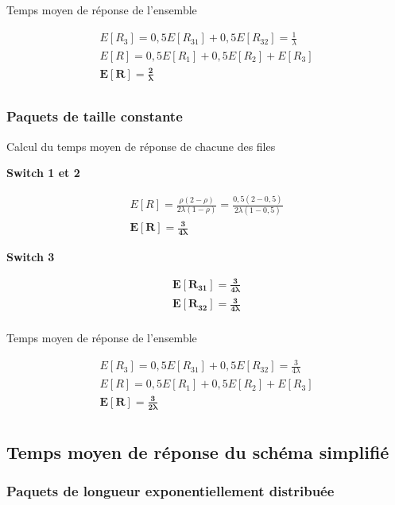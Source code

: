 \documentclass[12pt, a4paper]{article}
\begin{document}
\quad Temps moyen de r\'eponse de l'ensemble

\medskip

\begin{gather*}
E[R_{3}]=0,5E[R_{31}]+0,5E[R_{32}] = \frac{1}{\lambda} \\
E[R] = 0,5E[R_{1}] + 0,5E[R_{2}] + E[R_{3}] \\
\bm{E[R] = \frac{2}{\lambda}} \\
\end{gather*}

\subsubsection{Paquets de taille constante}

\quad Calcul du temps moyen de r\'eponse de chacune des files

\medskip
\textbf{Switch 1 et 2}

\begin{gather*}
E[R]=\frac{\rho(2-\rho)}{2\lambda(1-\rho)} = \frac{0,5(2-0,5)}{2\lambda(1-0,5)} \\
\bm{E[R] = \frac{3}{4\lambda}}
\end{gather*}

\textbf{Switch 3}

\begin{gather*}
\bm{E[R_{31}] = \frac{3}{4\lambda}} \\
\bm{E[R_{32}] = \frac{3}{4\lambda}} \\
\end{gather*}

\quad Temps moyen de r\'eponse de l'ensemble

\medskip

\begin{gather*}
E[R_{3}]=0,5E[R_{31}]+0,5E[R_{32}] = \frac{3}{4\lambda} \\
E[R] = 0,5E[R_{1}] + 0,5E[R_{2}] + E[R_{3}] \\
\bm{E[R] = \frac{3}{2\lambda}} \\
\end{gather*}

\subsection{Temps moyen de r\'eponse du sch\'ema simplifi\'e}
\subsubsection{Paquets de longueur exponentiellement distribu\'ee}
\end{document}
